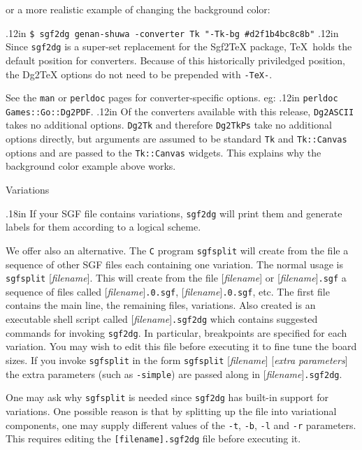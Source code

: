 \noindent
or a more realistic example of changing the background color:

\vglue.12in
    {\tt \$ sgf2dg genan-shuwa -converter Tk "-Tk-bg \#d2f1b4bc8c8b"}
\vglue.12in
Since {\tt sgf2dg} is a super-set replacement for the Sgf2TeX package,
\TeX\ holds the default position for converters.  Because of this
historically priviledged position, the Dg2TeX options do not need to
be prepended with {\tt -TeX-}.

See the {\tt man} or {\tt perldoc} pages for converter-specific
options.  eg:
\vglue.12in
    {\tt perldoc Games::Go::Dg2PDF}.
\vglue.12in
Of the converters available with this release, {\tt Dg2ASCII} takes
no additional options.  {\tt Dg2Tk} and therefore {\tt Dg2TkPs} take
no additional options directly, but arguments are assumed to be
standard {\tt Tk} and {\tt Tk::Canvas} options and are passed to
the {\tt Tk::Canvas} widgets.  This explains why the background
color example above works.

\vfil\eject
\centerline{\titlefont Variations}
\vglue.18in
If your SGF file contains variations, {\tt sgf2dg} will print them
and generate labels for them according to a logical scheme.

We offer also an alternative. The {\tt C} program {\tt sgfsplit} will 
create from the file a sequence of other SGF files each containing
one variation. The normal usage is {\tt sgfsplit} [{\it filename}]. This will
create from the file [{\it filename}] or [{\it filename}]{\tt .sgf} a sequence of
files called [{\it filename}]{\tt .0.sgf}, [{\it filename}]{\tt .0.sgf}, etc. The first
file contains the main line, the remaining files, variations. Also
created is an executable shell script called [{\it filename}]{\tt .sgf2dg}
which contains suggested commands for invoking {\tt sgf2dg}. In particular,
breakpoints are specified for each variation. You may wish to edit this file
before executing it to fine tune the board sizes. If you invoke {\tt sgfsplit}
in the form {\tt sgfsplit} [{\it filename}] [{\it extra parameters}] the
extra parameters (such as {\tt -simple}) are passed along in 
[{\it filename}]{\tt .sgf2dg}.

One may ask why {\tt sgfsplit} is needed since {\tt sgf2dg} has built-in
support for variations. One possible reason is that by splitting up the
file into variational components, one may supply different values of
the {\tt -t}, {\tt -b}, {\tt -l} and {\tt -r} parameters. This requires
editing the {\tt [filename].sgf2dg} file before executing it.


